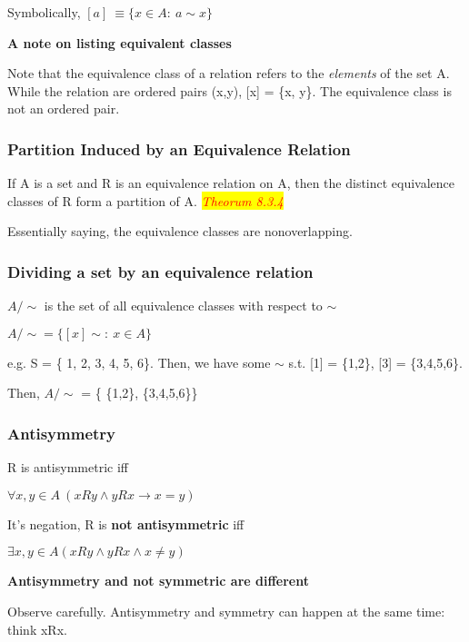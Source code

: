 \documentclass{article}
\newcommand{\theorum}[1]{\quad \quad \colorbox{yellow}{\textit{\textcolor{red}{Theorum #1}}}}
\begin{document}
Symbolically,
$[a]~ \equiv \{ x \in A:\ a \sim x \}$

\vspace{10pt}

\textbf{A note on listing equivalent classes}

Note that the equivalence class of a relation refers to the \textit{elements} of the set A. While the relation are ordered pairs (x,y), [x] = \{x, y\}. The equivalence class is not an ordered pair.

\subsubsection{Partition Induced by an Equivalence Relation}
If A is a set and R is an equivalence relation on A, then the distinct equivalence classes of R form a partition of A. \theorum{8.3.4}

Essentially saying, the equivalence classes are nonoverlapping.

\subsubsection{Dividing a set by an equivalence relation}
$A/\sim$ is the set of all equivalence classes with respect to $\sim$

$A/\sim = \{ [x]\sim:\ x \in A \}$

e.g. S = \{ 1, 2, 3, 4, 5, 6\}. Then, we have some $\sim$ s.t. [1] = \{1,2\}, [3] = \{3,4,5,6\}.

Then, $A/\sim$ = \{ \{1,2\}, \{3,4,5,6\}\}

\subsubsection{Antisymmetry}
R is antisymmetric iff

\begin{center}
    $\forall x,y \in A\ (xRy\wedge yRx \rightarrow x=y)$
\end{center}

It's negation, R is \textbf{not antisymmetric} iff
\begin{center}
    $\exists x,y \in A (xRy \wedge yRx \wedge x\neq y)$
\end{center}

\vspace{10pt}

\textbf{Antisymmetry and not symmetric are different}

Observe carefully. Antisymmetry and symmetry can happen at the same time: think xRx.
\end{document}
